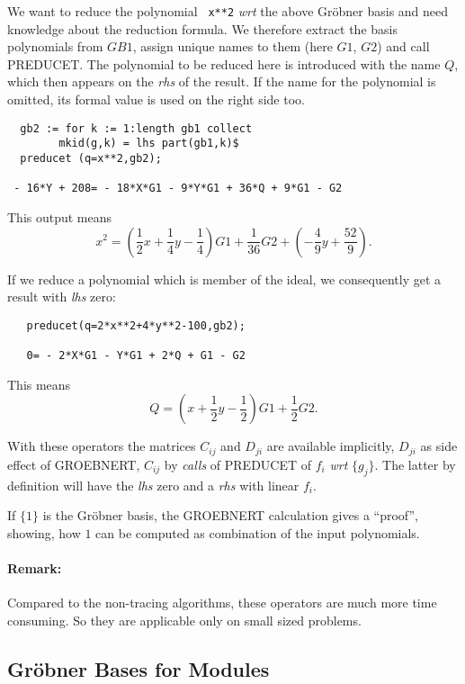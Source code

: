 We want to reduce the polynomial \verb+ x**2+ {\it  wrt}
the above Gr\"obner basis and need knowledge about the reduction
formula. We therefore extract the basis polynomials from $GB1$,
assign unique names to them (here $G1$, $G2$) and call PREDUCET.
The polynomial to be reduced here is introduced with the name $Q$,
which then appears on the {\it rhs} of the result. If the name for the
polynomial is omitted, its formal value is used on the right side too.

\begin{verbatim}
  gb2 := for k := 1:length gb1 collect
        mkid(g,k) = lhs part(gb1,k)$
  preducet (q=x**2,gb2);

 - 16*Y + 208= - 18*X*G1 - 9*Y*G1 + 36*Q + 9*G1 - G2
\end{verbatim}

This output means
\[
x^2 = (\frac{1}{2} x + \frac{1}{4} y - \frac{1}{4}) G1
 + \frac{1}{36} G2 + (-\frac{4}{9} y + \frac{52}{9}).
\]


\example {}

If we reduce a polynomial which is member of the ideal, we
consequently get a result with {\it lhs} zero:
\begin{verbatim}
   preducet(q=2*x**2+4*y**2-100,gb2);

   0= - 2*X*G1 - Y*G1 + 2*Q + G1 - G2
\end{verbatim}

This means
\[ Q = ( x + \frac{1}{2} y - \frac{1}{2}) G1 + \frac{1}{2} G2.
\]

With these operators the matrices $C_{ij}$ and $D_{ji}$ are available
implicitly, $D_{ji}$ as side effect of GROEBNERT, $C_{ij}$ by {\it calls}
of PREDUCET of $f_i$ {\it wrt} $\{g_j\}$. The latter by definition will
have the {\it lhs} zero and a {\it rhs} with linear $f_i$.

If $\{1\}$ is the Gr\"obner basis, the GROEBNERT calculation gives
a ``proof'', showing,  how  $1$ can be computed as combination of the
input polynomials.

\paragraph{Remark:} Compared to the non-tracing algorithms, these
operators are much more time consuming. So they are applicable
only on small sized problems.

\subsection{Gr\"obner Bases for Modules}


